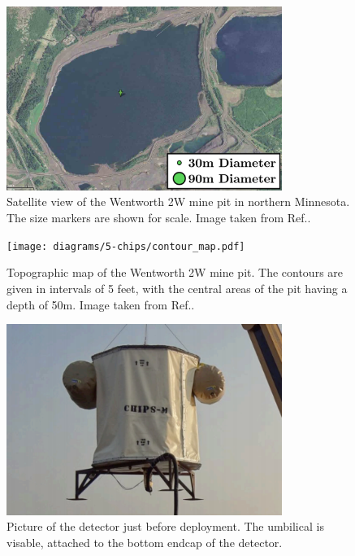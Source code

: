 \begin{figure} %
    \includegraphics[width=0.8\textwidth]{diagrams/5-chips/location.png}
    \caption[Satellite view of the Wentworth 2W mine pit.]
    {Satellite view of the Wentworth 2W mine pit in northern Minnesota.
        The size markers are shown for scale. Image taken from Ref.\cite{adamson2013}.}
    \label{fig:location}
\end{figure} %

\begin{figure} %
    \texttt{[image: diagrams/5-chips/contour\_map.pdf]}
    \caption[Topographic map of the Wentworth 2W mine pit.]
    {Topographic map of the Wentworth 2W mine pit. The contours are given in intervals of 5 feet,
        with the central areas of the pit having a depth of 50m. Image taken from
        Ref.\cite{adamson2013}.}
    \label{fig:contour_map}
\end{figure} %

\begin{figure} %
    \includegraphics[width=0.8\textwidth]{diagrams/5-chips/chips_m.png}
    \caption[Picture of the \chipsm detector.]
    {Picture of the \chipsm detector just before deployment. The umbilical is visable, attached to
        the bottom endcap of the detector.}
    \label{fig:chips_m}
\end{figure} %

